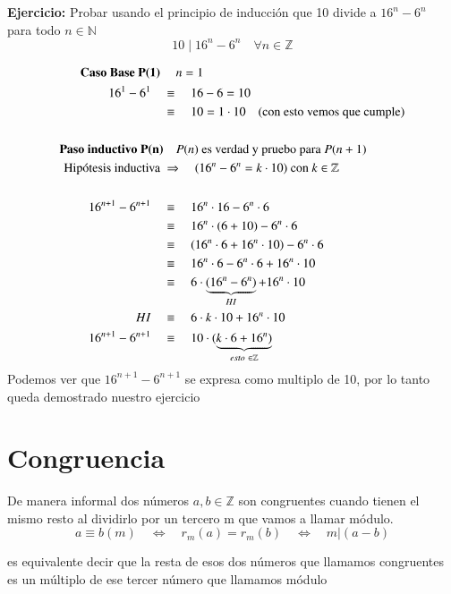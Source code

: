 \documentclass[12pt]{book}
\begin{document}
\begin{shaded}
\textbf{Ejercicio:} Probar usando el principio de inducción que 10 divide a $ 16^{n} - 6^{n}$ \\ para todo $n \in \mathbb N$  \\
\[	
	10  \mid 16^{n} - 6^{n} \quad \forall n \in \mathbb{Z}
\]
\end{shaded}

\begin{equation*}
\begin{split}
\textbf{Caso Base P(1) } & \quad n=1 \\
16^{1} - 6^{1} \quad   &\equiv \quad  16 - 6 = 10 \\
&\equiv \quad  10 = 1 \cdot 10 \text{\quad (con esto vemos que cumple)}\\ \\
\textbf{Paso inductivo P(n)} & \quad P(n) \text { es verdad y pruebo para } P(n+1)	\\
\text{Hip\'otesis inductiva } &\Rightarrow \quad (16^{n} - 6^{n} = k \cdot 10) \text{ con } k \in \mathbb{Z}\\ \\
16^{n+1} - 6^{n+1} \quad &\equiv  \quad   16^{n} \cdot 16 - 6^{n} \cdot 6  \\
&\equiv  \quad   16^{n} \cdot (6+10) - 6^{n} \cdot 6  \\
&\equiv  \quad   (16^{n} \cdot 6 + 16^{n} \cdot10) - 6^{n} \cdot 6  \\
&\equiv  \quad    16^{n} \cdot 6 - 6^{n} \cdot 6  +  16^{n} \cdot 10 \\
&\equiv  \quad   6 \cdot \underbrace{ (16^{n} - 6^{n}) }_{HI}  +  16^{n} \cdot 10 \\
HI \quad   &\equiv  \quad  6 \cdot k \cdot 10 + 16^{n} \cdot 10 \\
16^{n+1} - 6^{n+1} \quad  &\equiv  \quad  10 \cdot (\underbrace{  k \cdot 6 + 16^{n})}_{ esto \ \in \mathbb{Z}}  
\end{split}
\end{equation*}
Podemos ver que $ 16^{n+1} - 6^{n+1} $ se expresa como multiplo de 10, por lo tanto queda demostrado nuestro ejercicio


\chapter{Congruencia}

De manera informal dos números $a,b \in \mathbb{Z}$ son congruentes cuando tienen el mismo resto al dividirlo por un tercero m que vamos a llamar módulo.
\begin{equation*}
a \equiv b (m) \quad \Leftrightarrow \quad  r_m(a) = r_m(b) \quad  \Leftrightarrow \quad  m \vert (a-b)
\end{equation*}

es equivalente decir que la resta de esos dos números que llamamos congruentes es un múltiplo de ese tercer número que llamamos módulo
\end{document}
